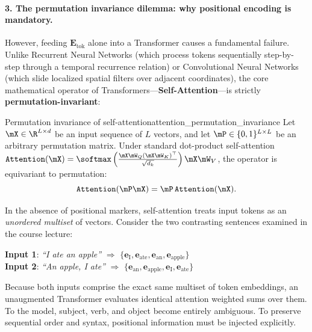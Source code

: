 \documentclass[../../main.tex]{subfiles}
\begin{document}
\paragraph{3. The permutation invariance dilemma: why positional encoding is mandatory.}
However, feeding $\mathbf{E}_{\text{tok}}$ alone into a Transformer causes a fundamental failure.
Unlike Recurrent Neural Networks (which process tokens sequentially step-by-step through a temporal recurrence relation) or Convolutional Neural Networks (which slide localized spatial filters over adjacent coordinates), the core mathematical operator of Transformers—\textbf{Self-Attention}—is strictly \textbf{permutation-invariant}:
\begin{theorem}{Permutation invariance of self-attention}{attention_permutation_invariance}
Let $\mX \in \R^{L \times d}$ be an input sequence of $L$ vectors, and let $\mP \in \{0, 1\}^{L \times L}$ be an arbitrary permutation matrix. Under standard dot-product self-attention $\text{\texttt{Attention}}(\mX) = \softmax\left(\frac{\mX \mW_Q (\mX \mW_K)^\top}{\sqrt{d_k}}\right) \mX \mW_V$, the operator is equivariant to permutation:
\begin{equation}
\label{eq:attention_permutation_proof}
\text{\texttt{Attention}}(\mP \mX) = \mP \, \text{\texttt{Attention}}(\mX).
\end{equation}
\end{theorem}
In the absence of positional markers, self-attention treats input tokens as an \emph{unordered multiset} of vectors. Consider the two contrasting sentences examined in the course lecture:
\begin{center}
\textbf{Input 1}: \textit{``I ate an apple''} \quad $\Longrightarrow$ \quad $\{\mathbf{e}_{\text{I}}, \mathbf{e}_{\text{ate}}, \mathbf{e}_{\text{an}}, \mathbf{e}_{\text{apple}}\}$ \\
\textbf{Input 2}: \textit{``An apple, I ate''} \quad $\Longrightarrow$ \quad $\{\mathbf{e}_{\text{an}}, \mathbf{e}_{\text{apple}}, \mathbf{e}_{\text{I}}, \mathbf{e}_{\text{ate}}\}$
\end{center}
Because both inputs comprise the exact same multiset of token embeddings, an unaugmented Transformer evaluates identical attention weighted sums over them. To the model, subject, verb, and object become entirely ambiguous. To preserve sequential order and syntax, positional information must be injected explicitly.
\end{document}
